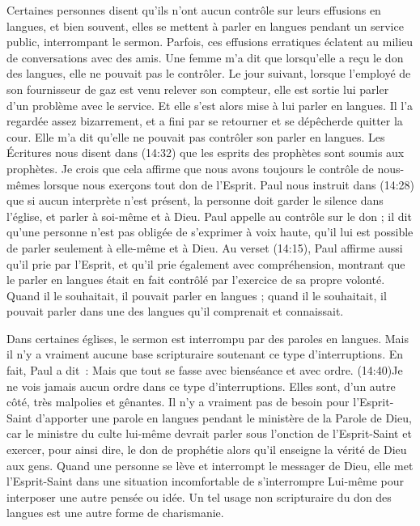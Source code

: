 Certaines personnes disent qu'ils n'ont aucun contrôle sur leurs effusions
 en langues, et bien souvent, elles se mettent à parler en langues
 pendant un service public, interrompant le sermon.
 Parfois, ces effusions erratiques éclatent au milieu de conversations
 avec des amis. Une femme m'a dit que lorsqu'elle a reçu le don des langues,
 elle ne pouvait pas le contrôler. Le jour suivant, lorsque l'employé de son
 fournisseur de gaz est venu relever son compteur, elle est sortie
 lui parler d'un problème avec le service. Et elle s'est alors mise
 à lui parler en langues. Il l'a regardée assez bizarrement,
 et a fini par se retourner et se dépêcherde quitter la cour.
 Elle m'a dit qu'elle ne pouvait pas contrôler son parler en langues.
 Les Écritures nous disent dans (14:32) que les esprits
 des prophètes sont soumis aux prophètes. Je crois que cela affirme
 que nous avons toujours le contrôle de nous-mêmes lorsque nous exerçons
 tout don de l'Esprit. Paul nous instruit dans (14:28)
 que si aucun interprète n'est présent, la personne doit garder
 le silence dans l'église, et parler à soi-même et à Dieu.
 Paul appelle au contrôle sur le don ; il dit qu'une personne n'est pas
 obligée de s'exprimer à voix haute, qu'il lui est possible de parler
 seulement à elle-même et à Dieu. Au verset (14:15),
 Paul affirme aussi qu'il prie par l'Esprit, et qu'il prie également
 avec compréhension, montrant que le parler en langues était en fait
 contrôlé par l'exercice de sa propre volonté. Quand il le souhaitait,
 il pouvait parler en langues ; quand il le souhaitait, il pouvait parler
 dans une des langues qu'il comprenait et connaissait.

Dans certaines églises, le sermon est interrompu par des paroles en langues.
 Mais il n'y a vraiment aucune base scripturaire soutenant ce type
 d'interruptions. En fait, Paul a dit~: \og Mais que tout se fasse
 avec bienséance et avec ordre. \fg{}(14:40)Je ne vois
 jamais aucun ordre dans ce type d'interruptions.
 Elles sont, d'un autre côté, très malpolies et gênantes.
 Il n'y a vraiment pas de besoin pour l'Esprit-Saint d'apporter une parole
 en langues pendant le ministère de la Parole de Dieu, car le ministre
 du culte lui-même devrait parler sous l'onction de l'Esprit-Saint
 et exercer, pour ainsi dire, le don de prophétie alors qu'il enseigne
 la vérité de Dieu aux gens. Quand une personne se lève et interrompt
 le messager de Dieu, elle met l'Esprit-Saint dans une situation
 incomfortable de s'interrompre Lui-même pour interposer une autre pensée
 ou idée. Un tel usage non scripturaire du don des langues est une autre
 forme de charismanie.



\closechapter
